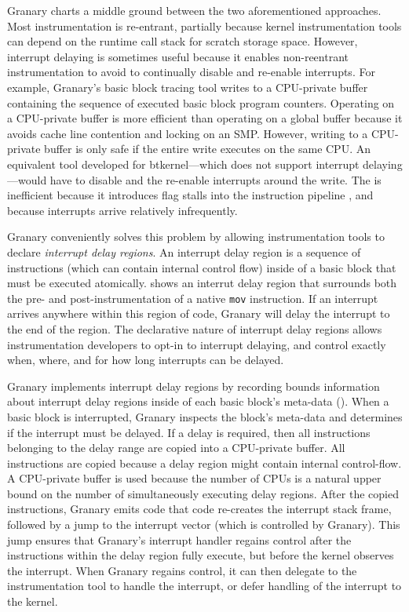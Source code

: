 \documentclass[preprint]{sigplanconf}
\begin{document}
Granary charts a middle ground between the two aforementioned approaches. Most instrumentation is re-entrant, partially because kernel instrumentation tools can depend on the runtime call stack for scratch storage space. However, interrupt delaying is sometimes useful because it enables non-reentrant instrumentation to avoid to continually disable and re-enable interrupts. For example, Granary's basic block tracing tool writes to a CPU-private buffer containing the sequence of executed basic block program counters. Operating on a CPU-private buffer is more efficient than operating on a global buffer because it avoids cache line contention and locking on an SMP. However, writing to a CPU-private buffer is only safe if the entire write executes on the same CPU. An equivalent tool developed for btkernel---which does not support interrupt delaying---would have to disable and the re-enable interrupts around the write. The is inefficient because it introduces flag stalls into the instruction pipeline \cite{AgnerMicroarchitecture}, and because interrupts arrive relatively infrequently.

Granary conveniently solves this problem by allowing instrumentation tools to declare \emph{interrupt delay regions}. An interrupt delay region is a sequence of instructions (which can contain internal control flow) inside of a basic block that must be executed atomically.  shows an interrut delay region that surrounds both the pre- and post-instrumentation of a native \texttt{mov} instruction. If an interrupt arrives anywhere within this region of code, Granary will delay the interrupt to the end of the region. The declarative nature of interrupt delay regions allows instrumentation developers to opt-in to interrupt delaying, and control exactly when, where, and for how long interrupts can be delayed.

Granary implements interrupt delay regions by recording bounds information about interrupt delay regions inside of each basic block's meta-data (). When a basic block is interrupted, Granary inspects the block's meta-data and determines if the interrupt must be delayed. If a delay is required, then all instructions belonging to the delay range are copied into a CPU-private buffer. All instructions are copied because a delay region might contain internal control-flow. A CPU-private buffer is used because the number of CPUs is a natural upper bound on the number of simultaneously executing delay regions. After the copied instructions, Granary emits code that code re-creates the interrupt stack frame, followed by a jump to the interrupt vector (which is controlled by Granary). This jump ensures that Granary's interrupt handler regains control after the instructions within the delay region fully execute, but before the kernel observes the interrupt. When Granary regains control, it can then delegate to the instrumentation tool to handle the interrupt, or defer handling of the interrupt to the kernel.
\end{document}
